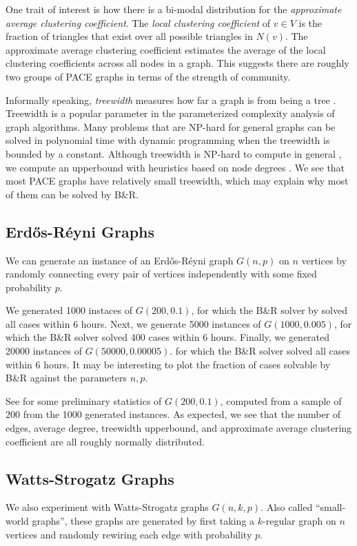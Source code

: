 \documentclass{article}
\begin{document}
One trait of interest is how there is a bi-modal distribution for the \emph{approximate average clustering coefficient}.
The \emph{local clustering coefficient} of $v\in V$
is the fraction of triangles that exist over all possible triangles in $N(v)$.
The approximate average clustering coefficient
estimates the average of the local clustering coefficients across all nodes in a graph.
This suggests there are roughly two groups of PACE graphs in terms of the strength of community.

Informally speaking, \emph{treewidth} measures how far a graph is from being a tree \citet{robertson1986graph}.
Treewidth is a popular parameter in the parameterized complexity analysis of graph algorithms.
Many problems that are NP-hard for general graphs can be solved in polynomial time
with dynamic programming
when the treewidth is bounded by a constant.
Although treewidth is NP-hard to compute in general \citet{treewidth_hardness},
we compute an upperbound with heuristics based on node degrees \citet{bodlaender2010treewidth}.
We see that most PACE graphs have relatively small treewidth,
which may explain why most of them can be solved by B\&R.

\subsection{Erd\H os-R\'eyni Graphs}
We can generate an instance of an Erd\H os-R\'eyni graph $G(n, p)$ on $n$ vertices
by randomly connecting every pair of vertices independently
with some fixed probability $p$.

We generated 1000 instaces of $G(200, 0.1)$,
for which the B\&R solver by \citet{kamis} solved all cases within 6 hours.
Next, we generate 5000 instances of $G(1000, 0.005)$,
for which the B\&R solver solved 400 cases within 6 hours.
Finally, we generated 20000 instances of $G(50000, 0.00005)$.
for which the B\&R solver solved all cases within 6 hours.
It may be interesting to plot the fraction of cases solvable by B\&R
against the parameters $n, p$.

See  for some preliminary statistics of $G(200, 0.1)$,
computed from a sample of 200 from the 1000 generated instances.
As expected,
we see that the number of edges,
average degree,
treewidth upperbound,
and approximate average clustering coefficient
are all roughly normally distributed.

\subsection{Watts-Strogatz Graphs}
We also experiment with Watts-Strogatz graphs $G(n, k, p)$.
Also called ``small-world graphs'',
these graphs are generated by first taking a $k$-regular graph on $n$ vertices
and randomly rewiring each edge with probability $p$.
\end{document}
